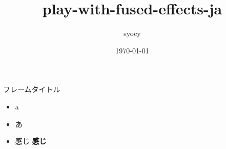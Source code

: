 \documentclass[luatex,unicode]{beamer}
\title{play-with-fused-effects-ja}
\author{syocy}
\date{\today}
\begin{document}
\begin{frame}
  \titlepage
\end{frame}

\begin{frame}{フレームタイトル}
  \begin{itemize}
  \item a
  \item あ
  \item 感じ \textbf{感じ}
  \end{itemize}
\end{frame}
\end{document}

